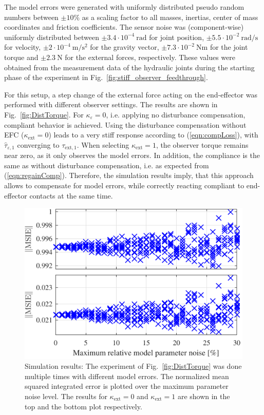 The model errors were generated with uniformly distributed pseudo random numbers between $\pm 10\%$ as a scaling factor to all masses, inertias, center of mass coordinates and friction coefficients.
The sensor noise was (component-wise) uniformly distributed between \mbox{$\pm 3.4\cdot10^{-4}~\mathrm{rad}$} for joint position, \mbox{$\pm 5.5\cdot10^{-2}~\mathrm{rad/s}$} for velocity, \mbox{$\pm 2\cdot10^{-4}~\mathrm{m/s^2}$} for the gravity vector, \mbox{$\pm 7.3\cdot10^{-2}~\mathrm{Nm}$} for the joint torque and \mbox{$\pm 2.3~\mathrm{N}$} for the external forces, respectively.
These values were obtained from the measurement data of the hydraulic joints during the starting phase of the experiment in Fig.~\ref{fig:stiff_observer_feedthrough}.

For this setup, a step change of the external force acting on the end-effector was performed with different observer settings.
The results are shown in Fig.~\ref{fig:DistTorque}.
For $\kappa_\varepsilon=0$, i.e. applying no disturbance compensation, compliant behavior is achieved. Using the disturbance compensation without EFC ($\kappa_\mathrm{ext}=0$) leads to a very stiff response according to (\ref{eqn:compLoss}), with $\hat{\tau}_{\varepsilon,1}$ converging to $\tau_{\mathrm{ext,1}}$.
When selecting $\kappa_\mathrm{ext}=1$, the observer torque remains near zero, as it only observes the model errors.
In addition, the compliance is the same as without disturbance compensation, i.e. as expected from (\ref{eqn:regainComp}).
Therefore, the simulation results imply, that this approach allows to compensate for model errors, while correctly reacting compliant to end-effector contacts at the same time.
%
\begin{figure}
\centering
\parbox{\columnwidth}{
\includegraphics[width=\linewidth]{simulations/SimExp_MdlNoiseExtForce.pdf}
}
\caption{Simulation results: The experiment of Fig.~\ref{fig:DistTorque} was done multiple times with different model errors.
The normalized mean squared integrated error is plotted over the maximum parameter noise level.
The results for $\kappa_\mathrm{ext}=0$ and $\kappa_\mathrm{ext}=1$ are shown in the top and the bottom plot respectively.}
\label{fig:MdlNoise}
\SkipBeforePicture
\vspace*{-1ex}
\end{figure}
